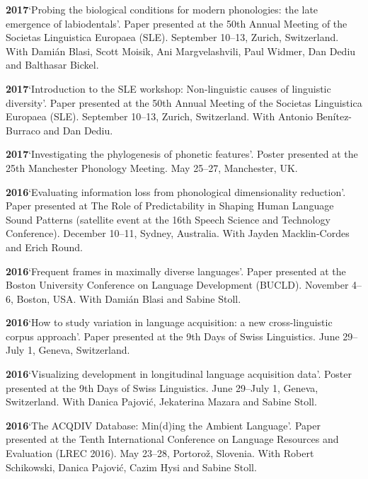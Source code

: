 \documentclass[11pt]{article}
\newcommand{\hangpara}{
 \setlength{\parindent}{0in} %
 \hangindent=0.42in %
}
\begin{document}
\vskip 6pt
\hangpara
{\bf 2017}\hspace{1ex}`Probing the biological conditions for modern phonologies: the late emergence of labiodentals'. Paper presented at the 50th Annual Meeting of the Societas Linguistica Europaea (SLE). September 10--13, Zurich, Switzerland. With Dami{\'a}n Blasi, Scott Moisik, Ani Margvelashvili, Paul Widmer, Dan Dediu and Balthasar Bickel.

\vskip 6pt
\hangpara
{\bf 2017}\hspace{1ex}`Introduction to the SLE workshop: Non-linguistic causes of linguistic diversity'. Paper presented at the 50th Annual Meeting of the Societas Linguistica Europaea (SLE). September 10--13, Zurich, Switzerland. With Antonio Benítez-Burraco and Dan Dediu.

\vskip 6pt
\hangpara
{\bf 2017}\hspace{1ex}`Investigating the phylogenesis of phonetic features'. Poster presented at the 25th Manchester Phonology Meeting. May 25--27, Manchester, UK.

\vskip 6pt
\hangpara
{\bf 2016}\hspace{1ex}`Evaluating information loss from phonological dimensionality reduction'. Paper presented at The Role of Predictability in Shaping Human Language Sound Patterns (satellite event at the 16th Speech Science and Technology Conference). December 10--11, Sydney, Australia. With Jayden Macklin-Cordes and Erich Round.

\vskip 6pt
\hangpara
{\bf 2016}\hspace{1ex}`Frequent frames in maximally diverse languages'. Paper presented at the Boston University Conference on Language Development (BUCLD). November 4--6, Boston, USA. With Dami{\'a}n Blasi and Sabine Stoll.

\vskip 6pt
\hangpara
{\bf 2016}\hspace{1ex}`How to study variation in language acquisition: a new cross-linguistic corpus approach'. Paper presented at the 9th Days of Swiss Linguistics. June 29--July 1, Geneva, Switzerland.

\vskip 6pt
\hangpara
{\bf 2016}\hspace{1ex}`Visualizing development in longitudinal language acquisition data'. Poster presented at the 9th Days of Swiss Linguistics. June 29--July 1, Geneva, Switzerland. With Danica Pajovi{\'c}, Jekaterina Mazara and Sabine Stoll.

\vskip 6pt
\hangpara
{\bf 2016}\hspace{1ex}`The ACQDIV Database: Min(d)ing the Ambient Language'. Paper presented at the Tenth International Conference on Language Resources and Evaluation (LREC 2016). May 23--28, Portoro{\v z}, Slovenia. With Robert Schikowski, Danica Pajovi{\'c}, Cazim Hysi and Sabine Stoll.
\end{document}
